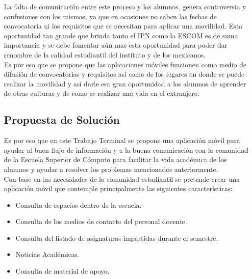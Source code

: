 \begin{itemize}
		La falta de comunicación entre este proceso y los alumnos, genera controversia y confusiones con los mismos, ya que en ocasiones no saben las fechas de convocatoria ni los requisitos que se necesitan para aplicar una movilidad. Esta oportunidad tan grande que brinda tanto el IPN como la ESCOM es de suma importancia y se debe fomentar aún mas esta oportunidad para poder dar renombre de la calidad estudiantil del instituto y de los mexicanos.\\
		
		Es por eso que se propone que las aplicaciones móviles funcionen como medio de difusión de convocatorias y requisitos así como de los lugares en donde se puede realizar la movilidad y así darle esa gran oportunidad a los alumnos de aprender de otras culturas y de como es realizar una vida en el extranjero.\\
		
	\end{itemize}
	
	\subsection{Propuesta de Solución}
	
	Es por eso que en este Trabajo Terminal se propone una aplicación móvil para ayudar al buen flujo de información y a la buena comunicación con la comunidad de la Escuela Superior de Cómputo para facilitar la vida académica de los alumnos y ayudar a resolver los problemas mencionados anteriormente.\\
	
	Con base en las necesidades de la comunidad estudiantil se pretende crear una aplicación móvil que contemple principalmente las siguientes características:
	\begin{itemize}
		\item Consulta de espacios dentro de la escuela.
		\item Consulta de los medios de contacto del personal docente.
		\item Consulta del listado de asignaturas impartidas durante el semestre.
		\item Noticias Académicas.
		\item  Consulta de material de apoyo.
	\end{itemize}
